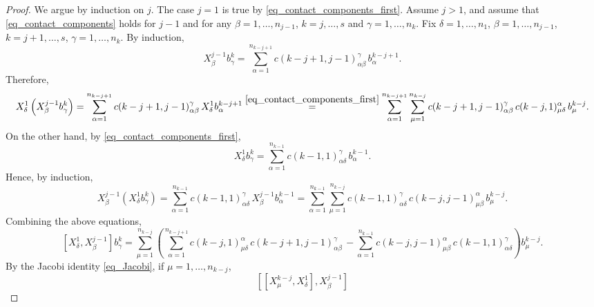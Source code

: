 \documentclass[10pt,a4paper]{amsart}
\begin{document}
\begin{proof}
We argue by induction on $j$. The case $j=1$ is true by \eqref{eq_contact_components_first}. Assume $j>1$, and assume that \eqref{eq_contact_components} holds for $j-1$ and for any $\beta=1,\dots,n_{j-1}$, $k=j,\dots,s$ and $\gamma=1,\dots,n_k$.
Fix $\delta=1,\dots,n_1$, $
\beta=1,\dots,n_{j-1}$, $
k=j+1,\dots,s$, 
$
\gamma=1,\dots,n_k$.
By induction,
\begin{equation*}
X^{j-1}_\beta b^k_\gamma
=
\sum_{\alpha=1}^{n_{k-j+1}}
c(k-j+1,j-1)^\gamma_{\alpha\beta} \,
b^{k-j+1}_\alpha.
\end{equation*}
Therefore,
\begin{equation*}
X^1_\delta\left(X^{j-1}_\beta b^k_\gamma\right)
=
\sum_{\alpha=1}^{n_{k-j+1}}
c(k-j+1,j-1)^\gamma_{\alpha\beta} \,
X^1_\delta b^{k-j+1}_\alpha
\overset{\eqref{eq_contact_components_first}}{=}
\sum_{\alpha=1}^{n_{k-j+1}}
\sum_{\mu=1}^{n_{k-j}}
c(k-j+1,j-1)^\gamma_{\alpha\beta} \,
c(k-j,1)^\alpha_{\mu\delta} \,
b^{k-j}_\mu.
\end{equation*}
On the other hand, by \eqref{eq_contact_components_first},
\begin{equation*}
X^1_\delta b^k_\gamma
=
\sum_{\alpha=1}^{n_{k-1}}
c(k-1,1)^\gamma_{\alpha\delta} \,
b^{k-1}_\alpha.
\end{equation*}
Hence, by induction,
\begin{equation*}
X^{j-1}_\beta\left(X^1_\delta b^k_\gamma\right)
=
\sum_{\alpha=1}^{n_{k-1}}
c(k-1,1)^\gamma_{\alpha\delta} \,
X^{j-1}_\beta b^{k-1}_\alpha
=
\sum_{\alpha=1}^{n_{k-1}}
\sum_{\mu=1}^{n_{k-j}}
c(k-1,1)^\gamma_{\alpha\delta} \,
c(k-j,j-1)^\alpha_{\mu\beta} \,
b^{k-j}_\mu.
\end{equation*}
Combining the above equations,
\begin{equation*}
\left[X^1_\delta,X^{j-1}_\beta\right]b^k_\gamma
=
\sum_{\mu=1}^{n_{k-j}}
\left(
\sum_{\alpha=1}^{n_{k-j+1}}
c(k-j,1)^\alpha_{\mu\delta} \,
c(k-j+1,j-1)^\gamma_{\alpha\beta} \,
-
\sum_{\alpha=1}^{n_{k-1}}
c(k-j,j-1)^\alpha_{\mu\beta} \,
c(k-1,1)^\gamma_{\alpha\delta}
\right)b^{k-j}_\mu.
\end{equation*}
By the Jacobi identity \eqref{eq_Jacobi}, if $\mu=1,\ldots,n_{k-j}$,
\begin{equation*}
\left[\left[X^{k-j}_\mu,X^1_\delta\right],X^{j-1}_\beta\right]

\end{equation*}
\end{proof}
\end{document}
